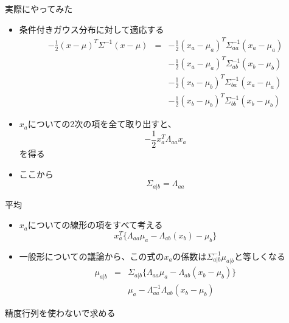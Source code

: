\begin{frame}{実際にやってみた}
 \begin{itemize}
	\item 条件付きガウス分布に対して適応する
			 \begin{eqnarray*}
				-\frac{1}{2}(x - \mu)^{T}\Sigma^{-1}(x-\mu) &= &
				 -\frac{1}{2}(x_a - \mu_a)^{T}\Sigma_{aa}^{-1}(x_a-\mu_a) \\
				&&-\frac{1}{2}(x_a - \mu_a)^{T}\Sigma_{ab}^{-1}(x_b-\mu_b) \\
				 &&-\frac{1}{2}(x_b - \mu_b)^{T}\Sigma_{ba}^{-1}(x_a-\mu_a) \\
				 &&-\frac{1}{2}(x_b - \mu_b)^{T}\Sigma_{bb}^{-1}(x_b-\mu_b)
			 \end{eqnarray*}
	\item $x_a$についての2次の項を全て取り出すと、
				\begin{equation}
				 -\frac{1}{2}x_a^T\Lambda_{aa}x_a
				\end{equation}
を得る
				\item ここから
							\begin{equation}
							 \Sigma_{a|b} = \Lambda_{aa}
							\end{equation}
 \end{itemize}
\end{frame}

\begin{frame}{平均}
\begin{itemize}
 \item $x_a$についての線形の項をすべて考える
	\begin{equation}
	 x_a^T\{ \Lambda_{aa}\mu_a-\Lambda_{ab}(x_b)-\mu_b\}
	\end{equation}
 \item 一般形についての議論から、この式の$x_a$の係数は$\Sigma^{-1}_{a|b}\mu_{a|b}$と等しくなる
			 \begin{eqnarray}
\mu_{a|b} &=& \Sigma_{a|b}\{\Lambda_{aa}\mu_a-\Lambda_{ab}(x_b-\mu_b)\}\\
				& & \mu_a - \Lambda_{aa}^{-1}\Lambda_{ab}(x_b-\mu_b)
			 \end{eqnarray}
\end{itemize}
\end{frame}

\begin{frame}{精度行列を使わないで求める}

\end{frame}

